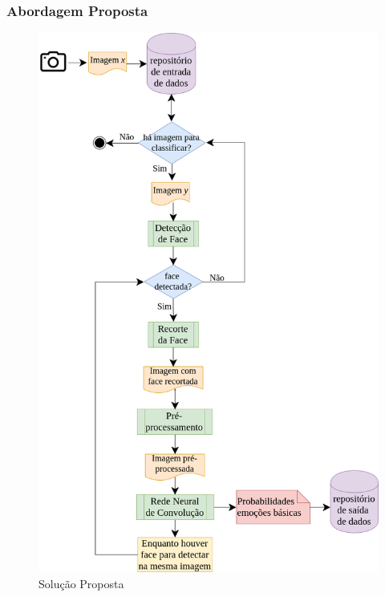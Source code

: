 \documentclass{beamer}
\begin{document}
\begin{frame}
\frametitle{Abordagem Proposta}
\begin{figure}
\centering
\includegraphics[scale=0.17]{figuras/arquitetura.png}
\caption{Solução Proposta}
\label{fig:arquitetura}
\end{figure}
\end{frame}
\end{document}

